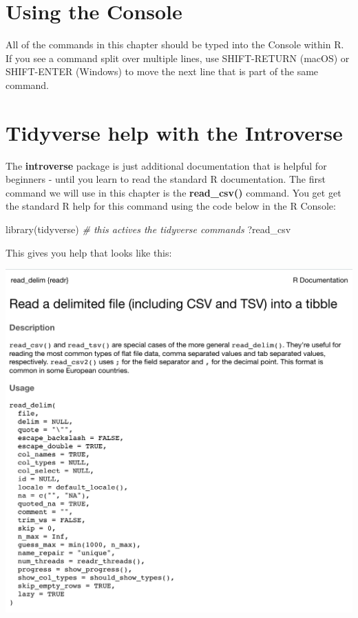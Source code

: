 \documentclass[
]{krantz}
\makeatletter
\newenvironment{Shaded}{\begin{snugshade}}{\end{snugshade}}
\newcommand{\CommentTok}[1]{\textcolor[rgb]{0.37,0.37,0.37}{\textit{#1}}}
\newcommand{\FunctionTok}[1]{\textcolor[rgb]{0,0,0}{#1}}
\newcommand{\NormalTok}[1]{#1}
\newenvironment{kframe}{%
\medskip{}
\setlength{\fboxsep}{.8em}
 \def\at@end@of@kframe{}%
 \ifinner\ifhmode%
  \def\at@end@of@kframe{\end{minipage}}%
  \begin{minipage}{\columnwidth}%
 \fi\fi%
 \def\FrameCommand##1{\hskip\@totalleftmargin \hskip-\fboxsep
 \colorbox{shadecolor}{##1}\hskip-\fboxsep
     \hskip-\linewidth \hskip-\@totalleftmargin \hskip\columnwidth}%
 \MakeFramed {\advance\hsize-\width
   \@totalleftmargin\z@ \linewidth\hsize
   \@setminipage}}%
 {\par\unskip\endMakeFramed%
 \at@end@of@kframe}
\renewenvironment{Shaded}{\begin{kframe}}{\end{kframe}}
\makeatother
\begin{document}
\hypertarget{using-the-console}{%
\section{Using the Console}\label{using-the-console}}

All of the commands in this chapter should be typed into the Console within R. If you see a command split over multiple lines, use SHIFT-RETURN (macOS) or SHIFT-ENTER (Windows) to move the next line that is part of the same command.

\hypertarget{tidyverse-help-with-the-introverse}{%
\section{Tidyverse help with the Introverse}\label{tidyverse-help-with-the-introverse}}

The \textbf{introverse} package is just additional documentation that is helpful for beginners - until you learn to read the standard R documentation. The first command we will use in this chapter is the \textbf{read\_csv()} command. You get get the standard R help for this command using the code below in the R Console:

\begin{Shaded}
\begin{Highlighting}[]
\FunctionTok{library}\NormalTok{(tidyverse) }\CommentTok{\# this actives the tidyverse commands}
\NormalTok{?read\_csv}
\end{Highlighting}
\end{Shaded}

This gives you help that looks like this:

\includegraphics[width=0.7\linewidth]{ch_tidy_intro/images/screenshot_R_help}
\end{document}
